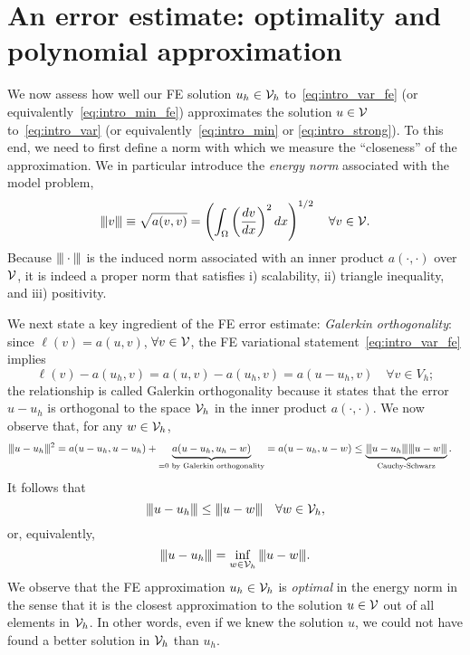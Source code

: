 \section{An error estimate: optimality and polynomial approximation}
We now assess how well our FE solution $u_h \in \mathcal{V}_h$ to~\eqref{eq:intro_var_fe} (or equivalently~\eqref{eq:intro_min_fe}) approximates the solution $u \in \mathcal{V}$ to~\eqref{eq:intro_var} (or equivalently~\eqref{eq:intro_min} or \eqref{eq:intro_strong}).  To this end, we need to first define a norm with which we measure the ``closeness'' of the approximation. We in particular introduce the \emph{energy norm} associated with the model problem,
\begin{equation*}
  |\kern-1pt|\kern-1pt| v |\kern-1pt|\kern-1pt| \equiv \sqrt{a(v,v)}  = \left( \int_{\Omega} \left( \frac{d v}{d x} \right)^2 dx \right)^{1/2} \quad \forall v \in \mathcal{V}.
\end{equation*}
Because $|\kern-1pt|\kern-1pt|  \cdot  |\kern-1pt|\kern-1pt|$ is the induced norm associated with an inner product $a(\cdot,\cdot)$ over $\mathcal{V}$, it is indeed a proper norm that satisfies i) scalability, ii) triangle inequality, and iii) positivity.  

We next state a key ingredient of the FE error estimate: \emph{Galerkin orthogonality}: since $\ell(v) = a(u,v)$, $\forall v \in \mathcal{V}$, the FE variational statement~\eqref{eq:intro_var_fe} implies
\begin{equation*}
  \ell(v) - a(u_h,v) = a(u,v) - a(u_h,v) = a(u-u_h,v) \quad \forall v \in V_h;
\end{equation*}
the relationship is called Galerkin orthogonality because it states that the error $u - u_h$ is orthogonal to the space $\mathcal{V}_h$ in the inner product $a(\cdot,\cdot)$. We now observe that, for any $w \in \mathcal{V}_h$,
\begin{align*}
  |\kern-1pt|\kern-1pt| u-u_h |\kern-1pt|\kern-1pt|^2
  &=
  a(u-u_h, u-u_h) + \underbrace{a(u-u_h,u_h - w)}_{= 0 \text{ by Galerkin orthogonality}}
  =
  a(u-u_h, u - w)
  \leq \underbrace{ |\kern-1pt|\kern-1pt| u - u_h |\kern-1pt|\kern-1pt| |\kern-1pt|\kern-1pt| u - w |\kern-1pt|\kern-1pt| }_{\text{Cauchy-Schwarz}}.
\end{align*}
It follows that
\begin{equation}
  |\kern-1pt|\kern-1pt| u - u_h |\kern-1pt|\kern-1pt| \leq |\kern-1pt|\kern-1pt| u - w |\kern-1pt|\kern-1pt| \quad \forall w \in \mathcal{V}_h,
  \label{eq:intro_fe_opt}
\end{equation}
or, equivalently,
\begin{equation*}
  |\kern-1pt|\kern-1pt| u-u_h |\kern-1pt|\kern-1pt| = \inf_{w \in \mathcal{V}_h} |\kern-1pt|\kern-1pt| u - w |\kern-1pt|\kern-1pt|.
\end{equation*}
We observe that the FE approximation $u_h \in \mathcal{V}_h$ is \emph{optimal} in the energy norm in the sense that it is the closest approximation to the solution $u \in \mathcal{V}$ out of all elements in $\mathcal{V}_h$.  In other words, even if we knew the solution $u$, we could not have found a better solution in $\mathcal{V}_h$ than $u_h$.

